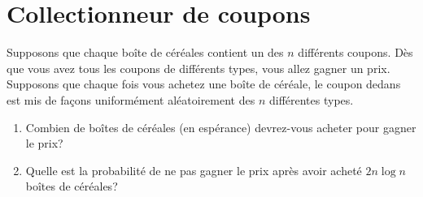 \documentclass[12pt]{article}
\begin{document}
\section{Collectionneur de coupons}
Supposons que chaque boîte de céréales contient un des $n$ différents coupons. Dès que vous avez tous les coupons de différents
types, vous allez gagner un prix. Supposons que chaque fois vous achetez une boîte de céréale, le coupon dedans est mis de fa\c cons
uniformément aléatoirement des $n$ différentes types. 
\begin{enumerate}
	\item Combien de boîtes de céréales (en espérance) devrez-vous acheter pour gagner le prix?
	\item Quelle est la probabilité de ne pas gagner le prix après avoir acheté $2n \log n$ boîtes de céréales?
\end{enumerate}
\end{document}
